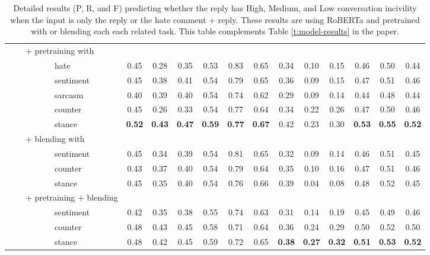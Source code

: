 \documentclass[11pt]{article}
\begin{document}
\begin{table*}
\begin{tabular}{l ccc ccc ccc ccc}
			~~~~+ pretraining with \\
			~~~~~~~~~~~hate	& 	0.45&	0.28&	0.35	&0.53	&0.83&	0.65&	0.34&	0.10	&0.15&	0.46&	0.50	&0.44 \\
			~~~~~~~~~~~sentiment	&0.45&	0.38&	0.41&	0.54&	0.79&	0.65&	0.36&	0.09&	0.15&	0.47&	0.51	&0.46 \\
			~~~~~~~~~~~sarcasm	&0.40&	0.39&	0.40&	0.54&	0.74	&0.62&	0.29&	0.09	&0.14&	0.44&	0.48&	0.44 \\
			~~~~~~~~~~~counter &	0.45&	0.26&	0.33&	0.54&	0.77&	0.64&	0.34&	0.22&	0.26&	0.47&	0.50&	0.46 \\
			~~~~~~~~~~~stance&	\textbf{0.52}&	\textbf{0.43}	&\textbf{0.47}&	\textbf{0.59}	&\textbf{0.77}	&\textbf{0.67}&	0.42&	0.23&	0.30	&\textbf{0.53}&	\textbf{0.55}&	\textbf{0.52} \\
			~~~~+ blending with \\
			~~~~~~~~~~~sentiment	&0.45&	0.34&	0.39&	0.54&	0.81&	0.65	&0.32	&0.09&	0.14&	0.46	&0.51&	0.45 \\
			~~~~~~~~~~~counter 	&0.43	&0.37	&0.40&	0.54&	0.79&	0.64&	0.35&	0.10 &	0.16&	0.47&	0.51&	0.46 \\
			~~~~~~~~~~~stance	&0.45&	0.35&	0.40&	0.54&	0.76&	0.66&	0.39	&0.04&	0.08&	0.48&	0.52	&0.45 \\
			~~~~+ pretraining + blending\\
			~~~~~~~~~~~sentiment&	0.42&	0.35&	0.38&	0.55&	0.74&	0.63&	0.31&	0.14&	0.19&	0.45&	0.49&	0.46 \\
			~~~~~~~~~~~counter 	&0.48&	0.43&	0.45&	0.58&	0.71	&0.64&	0.36&	0.24&	0.29&	0.50	&0.52	&0.50 \\
			~~~~~~~~~~~stance	&0.48&	0.42&	0.45&	0.59&	0.72	&0.65&	\textbf{0.38}&	\textbf{0.27}&	\textbf{0.32}&	\textbf{0.51}&	\textbf{0.53}&	\textbf{0.52} \\
			\bottomrule
			
		\end{tabular}
		\caption{Detailed results (P, R, and F) predicting whether the reply has High, Medium, and Low conversation incivility when the input is only the reply or the hate comment + reply. These results are using RoBERTa and pretrained with or blending each each related task. This table complements Table \ref{t:model-results} in the paper.}
		\label{t:detailed-results}
	\end{table*}
	
\end{document}
